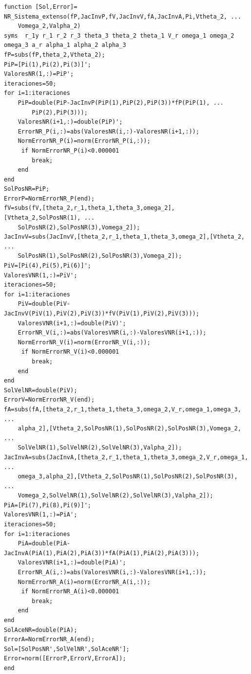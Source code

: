 \documentclass[12pt]{article}
\begin{document}
\begin{lstlisting}
function [Sol,Error]= NR_Sistema_extenso(fP,JacInvP,fV,JacInvV,fA,JacInvA,Pi,Vtheta_2, ...
    Vomega_2,Valpha_2)
syms  r_1y r_1 r_2 r_3 theta_3 theta_2 theta_1 V_r omega_1 omega_2 omega_3 a_r alpha_1 alpha_2 alpha_3
fP=subs(fP,theta_2,Vtheta_2);
PiP=[Pi(1),Pi(2),Pi(3)]';
ValoresNR(1,:)=PiP';
iteraciones=50;
for i=1:iteraciones
    PiP=double(PiP-JacInvP(PiP(1),PiP(2),PiP(3))*fP(PiP(1), ...
        PiP(2),PiP(3)));
    ValoresNR(i+1,:)=double(PiP)';
    ErrorNR_P(i,:)=abs(ValoresNR(i,:)-ValoresNR(i+1,:));
    NormErrorNR_P(i)=norm(ErrorNR_P(i,:));
     if NormErrorNR_P(i)<0.000001
        break;
    end
end
SolPosNR=PiP;
ErrorP=NormErrorNR_P(end);
fV=subs(fV,[theta_2,r_1,theta_1,theta_3,omega_2],[Vtheta_2,SolPosNR(1), ...
    SolPosNR(2),SolPosNR(3),Vomega_2]);
JacInvV=subs(JacInvV,[theta_2,r_1,theta_1,theta_3,omega_2],[Vtheta_2, ...
    SolPosNR(1),SolPosNR(2),SolPosNR(3),Vomega_2]);
PiV=[Pi(4),Pi(5),Pi(6)]';
ValoresVNR(1,:)=PiV';
iteraciones=50;
for i=1:iteraciones
    PiV=double(PiV-JacInvV(PiV(1),PiV(2),PiV(3))*fV(PiV(1),PiV(2),PiV(3)));
    ValoresVNR(i+1,:)=double(PiV)';
    ErrorNR_V(i,:)=abs(ValoresVNR(i,:)-ValoresVNR(i+1,:));
    NormErrorNR_V(i)=norm(ErrorNR_V(i,:));
     if NormErrorNR_V(i)<0.000001
        break;
    end
end
SolVelNR=double(PiV);
ErrorV=NormErrorNR_V(end);
fA=subs(fA,[theta_2,r_1,theta_1,theta_3,omega_2,V_r,omega_1,omega_3, ...
    alpha_2],[Vtheta_2,SolPosNR(1),SolPosNR(2),SolPosNR(3),Vomega_2, ...
    SolVelNR(1),SolVelNR(2),SolVelNR(3),Valpha_2]);
JacInvA=subs(JacInvA,[theta_2,r_1,theta_1,theta_3,omega_2,V_r,omega_1, ...
    omega_3,alpha_2],[Vtheta_2,SolPosNR(1),SolPosNR(2),SolPosNR(3), ...
    Vomega_2,SolVelNR(1),SolVelNR(2),SolVelNR(3),Valpha_2]);
PiA=[Pi(7),Pi(8),Pi(9)]';
ValoresVNR(1,:)=PiA';
iteraciones=50;
for i=1:iteraciones
    PiA=double(PiA-JacInvA(PiA(1),PiA(2),PiA(3))*fA(PiA(1),PiA(2),PiA(3)));
    ValoresVNR(i+1,:)=double(PiA)';
    ErrorNR_A(i,:)=abs(ValoresVNR(i,:)-ValoresVNR(i+1,:));
    NormErrorNR_A(i)=norm(ErrorNR_A(i,:));
     if NormErrorNR_A(i)<0.000001
        break;
    end
end
SolAceNR=double(PiA);
ErrorA=NormErrorNR_A(end);
Sol=[SolPosNR',SolVelNR',SolAceNR'];
Error=norm([ErrorP,ErrorV,ErrorA]);
end

\end{lstlisting}
\newpage
\end{document}
